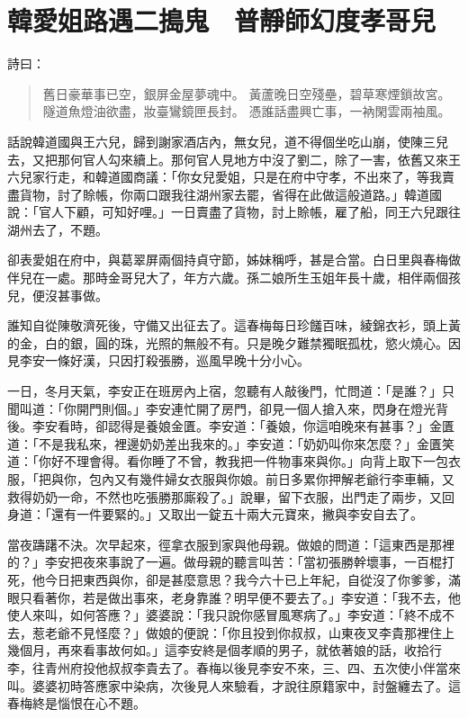
\chapter{韓愛姐路遇二搗鬼　普靜師幻度孝哥兒}

詩曰：
\begin{quote}
舊日豪華事已空，銀屏金屋夢魂中。
黃蘆晚日空殘壘，碧草寒煙鎖故宮。
隧道魚燈油欲盡，妝臺鸞鏡匣長封。
憑誰話盡興亡事，一衲閑雲兩袖風。
\end{quote}

話說韓道國與王六兒，歸到謝家酒店內，無女兒，道不得個坐吃山崩，使陳三兒去，又把那何官人勾來續上。那何官人見地方中沒了劉二，除了一害，依舊又來王六兒家行走，和韓道國商議：「你女兒愛姐，只是在府中守孝，不出來了，等我賣盡貨物，討了賒帳，你兩口跟我往湖州家去罷，省得在此做這般道路。」韓道國說：「官人下顧，可知好哩。」一日賣盡了貨物，討上賒帳，雇了船，同王六兒跟往湖州去了，不題。

卻表愛姐在府中，與葛翠屏兩個持貞守節，姊妹稱呼，甚是合當。白日里與春梅做伴兒在一處。那時金哥兒大了，年方六歲。孫二娘所生玉姐年長十歲，相伴兩個孩兒，便沒甚事做。

誰知自從陳敬濟死後，守備又出征去了。這春梅每日珍饈百味，綾錦衣衫，頭上黃的金，白的銀，圓的珠，光照的無般不有。只是晚夕難禁獨眠孤枕，慾火燒心。因見李安一條好漢，只因打殺張勝，巡風早晚十分小心。

一日，冬月天氣，李安正在班房內上宿，忽聽有人敲後門，忙問道：「是誰？」只聞叫道：「你開門則個。」李安連忙開了房門，卻見一個人搶入來，閃身在燈光背後。李安看時，卻認得是養娘金匱。李安道：「養娘，你這咱晚來有甚事？」金匱道：「不是我私來，裡邊奶奶差出我來的。」李安道：「奶奶叫你來怎麼？」金匱笑道：「你好不理會得。看你睡了不曾，教我把一件物事來與你。」向背上取下一包衣服，「把與你，包內又有幾件婦女衣服與你娘。前日多累你押解老爺行李車輛，又救得奶奶一命，不然也吃張勝那廝殺了。」說畢，留下衣服，出門走了兩步，又回身道：「還有一件要緊的。」又取出一錠五十兩大元寶來，撇與李安自去了。

當夜躊躇不決。次早起來，徑拿衣服到家與他母親。做娘的問道：「這東西是那裡的？」李安把夜來事說了一遍。做母親的聽言叫苦：「當初張勝幹壞事，一百棍打死，他今日把東西與你，卻是甚麼意思？我今六十已上年紀，自從沒了你爹爹，滿眼只看著你，若是做出事來，老身靠誰？明早便不要去了。」李安道：「我不去，他使人來叫，如何答應？」婆婆說：「我只說你感冒風寒病了。」李安道：「終不成不去，惹老爺不見怪麼？」做娘的便說：「你且投到你叔叔，山東夜叉李貴那裡住上幾個月，再來看事故何如。」這李安終是個孝順的男子，就依著娘的話，收拾行李，往青州府投他叔叔李貴去了。春梅以後見李安不來，三、四、五次使小伴當來叫。婆婆初時答應家中染病，次後見人來驗看，才說往原籍家中，討盤纏去了。這春梅終是惱恨在心不題。

